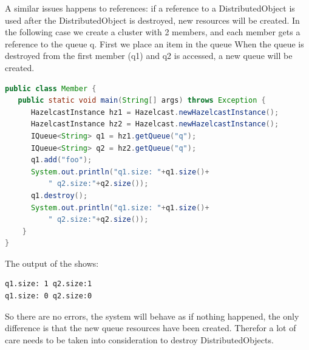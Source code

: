 A similar issues happens to references: if a reference to a DistributedObject is used after the DistributedObject is destroyed, new resources will be created. In the following case we create a cluster with 2 members, and each member gets a reference to the queue q. First we place an item in the queue When the queue is destroyed from the first member (q1) and q2 is accessed, a new queue will be created. 
\begin{lstlisting}[language=java]
public class Member {
   public static void main(String[] args) throws Exception {
      HazelcastInstance hz1 = Hazelcast.newHazelcastInstance();
      HazelcastInstance hz2 = Hazelcast.newHazelcastInstance();
      IQueue<String> q1 = hz1.getQueue("q");
      IQueue<String> q2 = hz2.getQueue("q");
      q1.add("foo");
      System.out.println("q1.size: "+q1.size()+
          " q2.size:"+q2.size());
      q1.destroy();
      System.out.println("q1.size: "+q1.size()+
          " q2.size:"+q2.size());
    }
}
\end{lstlisting}
The output of the shows:
\begin{lstlisting}
q1.size: 1 q2.size:1
q1.size: 0 q2.size:0
\end{lstlisting}
So there are no errors, the system will behave as if nothing happened, the only difference is that the new queue resources have been created. Therefor a lot of care needs to be taken into consideration to destroy DistributedObjects. 

